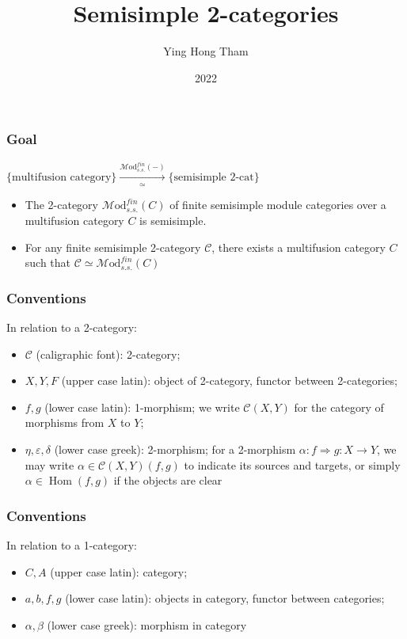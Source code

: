 \documentclass{beamer}
\title{Semisimple 2-categories}
\author{Ying Hong Tham}
\institute{UHH}
\date{2022}
\newcommand{\veps}{{\varepsilon}}
\DeclareMathOperator{\Hom}{Hom} %
\newcommand{\cC}{{\mathcal{C}}}
\newcommand{\Mod}{{\mathcal{M}\textrm{od}}}
\begin{document}
\frame{\titlepage}

\begin{frame}
\frametitle{Goal}
$\{\text{multifusion category}\}
\xrightarrow[\simeq]{\Mod_{s.s.}^{fin}(-)}
\{\text{semisimple 2-cat}\}$
\\

\begin{itemize}
\item The 2-category $\Mod_{s.s.}^{fin}(C)$
of finite semisimple module categories
over a multifusion category $C$
is semisimple.

\item For any finite semisimple 2-category $\cC$,
there exists a multifusion category $C$ such that
$\cC \simeq \Mod_{s.s.}^{fin}(C)$
\end{itemize}
\end{frame}

\begin{frame}
\frametitle{Conventions}
In relation to a 2-category:
\begin{itemize}
\item $\cC$ (caligraphic font): 2-category;

\item $X,Y,F$ (upper case latin): object of 2-category,
	functor between 2-categories;

\item $f,g$ (lower case latin): 1-morphism;
	we write $\cC(X,Y)$ for the category of morphisms
	from $X$ to $Y$;

\item $\eta,\veps,\delta$ (lower case greek): 2-morphism;
	for a 2-morphism $\alpha: f \Rightarrow g: X \to Y$,
	we may write $\alpha \in \cC(X,Y)(f,g)$
	to indicate its sources and targets,
	or simply $\alpha \in \Hom(f,g)$ if the objects are clear
\end{itemize}

\end{frame}


\begin{frame}
\frametitle{Conventions}
In relation to a 1-category:
\begin{itemize}
\item $C,A$ (upper case latin): category;

\item $a,b,f,g$ (lower case latin): objects in category,
	functor between categories;

\item $\alpha,\beta$ (lower case greek): morphism in category
\end{itemize}

\end{frame}
\end{document}
